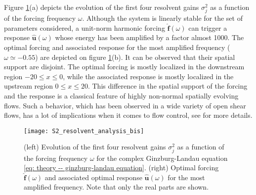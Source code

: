     Figure \ref{fig: theory -- resolvent analysis}(a) depicts the evolution of the first four resolvent gains $\sigma_j^2$ as a function of the forcing frequency $\omega$. Although the system is linearly stable for the set of parameters considered, a unit-norm harmonic forcing $\hat{\mathbf{f}}(\omega)$ can trigger a response $\hat{\mathbf{u}}(\omega)$ whose energy has been amplified by a factor almost 1000. The optimal forcing and associated response for the most amplified frequency ($\omega \simeq -0.55$) are depicted on figure \ref{fig: theory -- resolvent analysis}(b). It can be observed that their spatial support are disjoint. The optimal forcing is mostly localized in the downstream region $-20 \le x \le 0$, while the associated response is mostly localized in the upstream region $0 \le x \le 20$. This difference in the spatial support of the forcing and the response is a classical feature of highly non-normal spatially evolving flows. Such a behavior, which has been observed in a wide variety of open shear flows, has a lot of implications when it comes to flow control, see \cite{amr:bagheri:2009} for more details.

    \begin{figure}
      \centering
      \texttt{[image: S2\_resolvent\_analysis\_bis]}
      \caption{(left) Evolution of the first four resolvent gains $\sigma_j^2$ as a function of the forcing frequency $\omega$ for the complex Ginzburg-Landau equation \eqref{eq: theory -- ginzburg-landau equation}. (right) Optimal forcing $\hat{\mathbf{f}}(\omega)$ and associated optimal response $\hat{\mathbf{u}}(\omega)$ for the most amplified frequency. Note that only the real parts are shown.}
      \label{fig: theory -- resolvent analysis}
    \end{figure}
